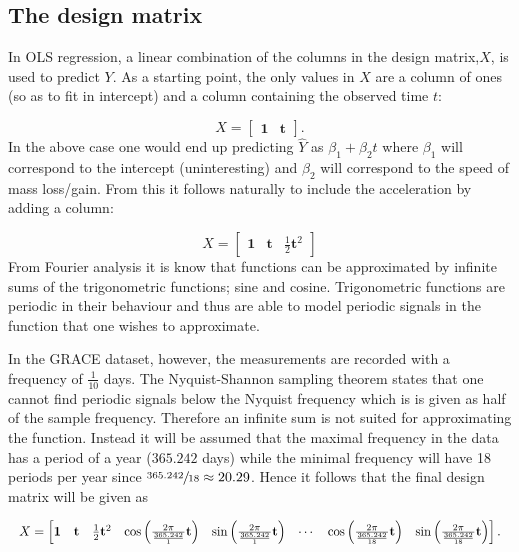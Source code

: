 \subsection{The design matrix}
In OLS regression, a linear combination of the columns in the design matrix,$X$,  is used to predict $Y$.
As a starting point, the only values in $X$ are a column of ones (so as to fit in intercept) and a column containing the observed time $t$:

\begin{equation}
X = \left[\begin{matrix} \mathbf{1} & \mathbf{t} \end{matrix}\right].
\end{equation}
In the above case one would end up predicting $\hat{Y}$ as  $\beta_1 + \beta_2 t$ where $\beta_1$ will correspond to the intercept (uninteresting) and $\beta_2$ will correspond to the speed of mass loss/gain.
From this it follows naturally to include the acceleration by adding a column:

\begin{equation}
X = \left[\begin{matrix} \mathbf{1} & \mathbf{t} & \frac{1}{2} \mathbf{t}^2 \end{matrix}\right]
\end{equation} 
From Fourier analysis it is know that functions can be approximated by infinite sums of the trigonometric functions; sine and cosine.
Trigonometric functions are periodic in their behaviour and thus are able to model periodic signals in the function that one wishes to approximate.

In the GRACE dataset, however, the measurements are recorded with a frequency of $\frac{1}{10}$ days.
The Nyquist-Shannon sampling theorem states that one cannot find periodic signals below the Nyquist frequency which is is given as half of the sample frequency. 
Therefore an infinite sum is not suited for approximating the function. 
Instead it will be assumed that the maximal frequency in the data has a period of a year ($365.242$ days) while the minimal frequency will have 18 periods per year since  $\sfrac{365.242}{18} \approx 20.29$. Hence it follows that the final design matrix will be given as

\begin{equation*}
\resizebox{\textwidth}{!}{$
X = \left[\begin{matrix}
	\mathbf{1} &
	\mathbf{t} &
	\frac{1}{2} \mathbf{t}^2 &
	\cos\left( \frac{2 \pi}{\frac{365.242}{1}} \mathbf{t} \right) &
	\sin\left( \frac{2 \pi}{\frac{365.242}{1}} \mathbf{t} \right) &
	\cdots &
	\cos\left( \frac{2 \pi}{\frac{365.242}{18}} \mathbf{t} \right) &
	\sin\left( \frac{2 \pi}{\frac{365.242}{18}} \mathbf{t} \right)
\end{matrix}\right].
$}
\end{equation*}

